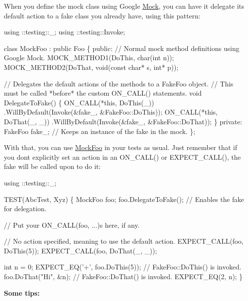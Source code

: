 When you define the mock class using Google \hyperlink{class_mock}{Mock}, you can have it delegate its default action to a fake class you already have, using this pattern\+:


\begin{DoxyCode}
using ::testing::\_;
using ::testing::Invoke;

class MockFoo : public Foo \{
 public:
  // Normal mock method definitions using Google Mock.
  MOCK\_METHOD1(DoThis, char(int n));
  MOCK\_METHOD2(DoThat, void(const char* s, int* p));

  // Delegates the default actions of the methods to a FakeFoo object.
  // This must be called *before* the custom ON\_CALL() statements.
  void DelegateToFake() \{
    ON\_CALL(*this, DoThis(\_))
        .WillByDefault(Invoke(&fake\_, &FakeFoo::DoThis));
    ON\_CALL(*this, DoThat(\_, \_))
        .WillByDefault(Invoke(&fake\_, &FakeFoo::DoThat));
  \}
 private:
  FakeFoo fake\_;  // Keeps an instance of the fake in the mock.
\};
\end{DoxyCode}


With that, you can use {\ttfamily \hyperlink{class_mock_foo}{Mock\+Foo}} in your tests as usual. Just remember that if you don\textquotesingle{}t explicitly set an action in an {\ttfamily O\+N\+\_\+\+C\+A\+L\+L()} or {\ttfamily E\+X\+P\+E\+C\+T\+\_\+\+C\+A\+L\+L()}, the fake will be called upon to do it\+:


\begin{DoxyCode}
using ::testing::\_;

TEST(AbcTest, Xyz) \{
  MockFoo foo;
  foo.DelegateToFake(); // Enables the fake for delegation.

  // Put your ON\_CALL(foo, ...)s here, if any.

  // No action specified, meaning to use the default action.
  EXPECT\_CALL(foo, DoThis(5));
  EXPECT\_CALL(foo, DoThat(\_, \_));

  int n = 0;
  EXPECT\_EQ('+', foo.DoThis(5));  // FakeFoo::DoThis() is invoked.
  foo.DoThat("Hi", &n);           // FakeFoo::DoThat() is invoked.
  EXPECT\_EQ(2, n);
\}
\end{DoxyCode}


{\bfseries Some tips\+:}


